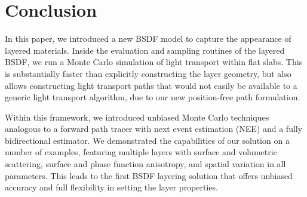 \section{Conclusion}
\label{sec:conclusion}


In this paper, we introduced a new BSDF model to capture the appearance of layered materials. Inside the evaluation and sampling routines of the layered BSDF, we run a Monte Carlo simulation of light transport within flat slabs. This is substantially faster than explicitly constructing the layer geometry, but also allows constructing light transport paths that would not easily be available to a generic light transport algorithm, due to our new position-free path formulation.

Within this framework, we introduced unbiased Monte Carlo techniques analogous to a forward path tracer with next event estimation (NEE) and a fully bidirectional estimator. We demonstrated the capabilities of our solution on a number of examples, featuring multiple layers with surface and volumetric scattering, surface and phase function anisotropy, and spatial variation in all parameters. This leads to the first BSDF layering solution that offers unbiased accuracy and full flexibility in setting the layer properties.
